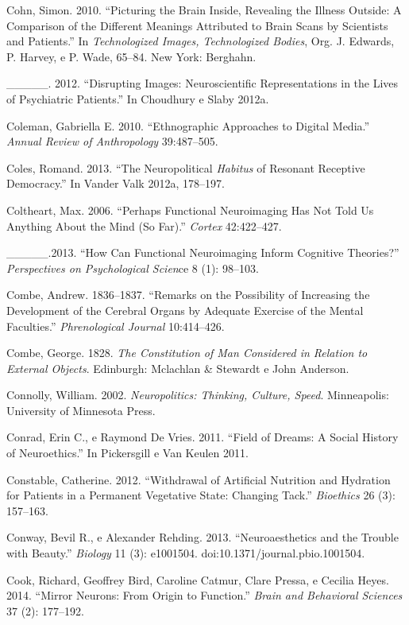 {\begin{Parskip}
Cohn, Simon. 2010. ``Picturing the Brain Inside, Revealing the Illness
Outside: A Comparison of the Different Meanings Attributed to Brain
Scans by Scientists and Patients.'' In \emph{Technologized Images,
Technologized Bodies}, Org. J. Edwards, P. Harvey, e P. Wade, 65--84.
New York: Berghahn.

\_\_\_\_\_. 2012. ``Disrupting Images: Neuroscientific Representations in
the Lives of Psychiatric Patients.'' In Choudhury e Slaby 2012a.

Coleman, Gabriella E. 2010. ``Ethnographic Approaches to Digital
Media.'' \emph{Annual Review of Anthropology} 39:487--505.

Coles, Romand. 2013. ``The Neuropolitical \emph{Habitus} of Resonant
Receptive Democracy.'' In Vander Valk 2012a, 178--197.

Coltheart, Max. 2006. ``Perhaps Functional Neuroimaging Has Not Told Us
Anything About the Mind (So Far).'' \emph{Cortex} 42:422--427.

\_\_\_\_\_.2013. ``How Can Functional Neuroimaging Inform Cognitive
Theories?'' \emph{Perspectives on Psychological Scien}ce 8 (1): 98--103.

Combe, Andrew. 1836--1837. ``Remarks on the Possibility of Increasing
the Development of the Cerebral Organs by Adequate Exercise of the
Mental Faculties.'' \emph{Phrenological Journal} 10:414--426.

Combe, George. 1828. \emph{The Constitution of Man Considered in
Relation to External Objects}. Edinburgh: Mclachlan \& Stewardt e John
Anderson.

Connolly, William. 2002. \emph{Neuropolitics: Thinking, Culture, Speed}.
Minneapolis: University of Minnesota Press.

Conrad, Erin C., e Raymond De Vries. 2011. ``Field of Dreams: A Social
History of Neuroethics.'' In Pickersgill e Van Keulen 2011.

Constable, Catherine. 2012. ``Withdrawal of Artificial Nutrition and
Hydration for Patients in a Permanent Vegetative State: Changing Tack.''
\emph{Bioethics} 26 (3): 157--163.

Conway, Bevil R., e Alexander Rehding. 2013. ``Neuroaesthetics and the
Trouble with Beauty.'' \emph{ Biology} 11 (3): e1001504.
doi:10.1371/journal.pbio.1001504.

Cook, Richard, Geoffrey Bird, Caroline Catmur, Clare Pressa, e Cecilia
Heyes. 2014. ``Mirror Neurons: From Origin to Function.'' \emph{Brain
and Behavioral Sciences} 37 (2): 177--192.


\end{Parskip}}
